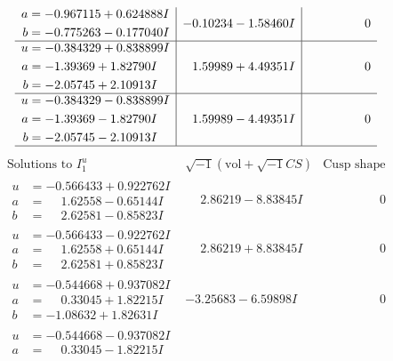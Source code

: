 \documentclass[1p]{elsarticle_modified}
\theoremstyle{definition}
\newcommand{\I}{\sqrt{-1}}
\begin{document}
$$\begin{array}{c|c|c}
\begin{aligned}
a &= -0.967115 + 0.624888 I \\
b &= -0.775263 - 0.177040 I\end{aligned}
 & -0.10234 - 1.58460 I & \phantom{-0.000000 } 0 \\ \hline\begin{aligned}
u &= -0.384329 + 0.838899 I \\
a &= -1.39369 + 1.82790 I \\
b &= -2.05745 + 2.10913 I\end{aligned}
 & \phantom{-}1.59989 + 4.49351 I & \phantom{-0.000000 } 0 \\ \hline\begin{aligned}
u &= -0.384329 - 0.838899 I \\
a &= -1.39369 - 1.82790 I \\
b &= -2.05745 - 2.10913 I\end{aligned}
 & \phantom{-}1.59989 - 4.49351 I & \phantom{-0.000000 } 0\\
 \hline 
 \end{array}$$\newpage$$\begin{array}{c|c|c}  
\text{Solutions to }I^u_{1}& \I (\text{vol} + \sqrt{-1}CS) & \text{Cusp shape}\\
 \hline 
\begin{aligned}
u &= -0.566433 + 0.922762 I \\
a &= \phantom{-}1.62558 - 0.65144 I \\
b &= \phantom{-}2.62581 - 0.85823 I\end{aligned}
 & \phantom{-}2.86219 - 8.83845 I & \phantom{-0.000000 } 0 \\ \hline\begin{aligned}
u &= -0.566433 - 0.922762 I \\
a &= \phantom{-}1.62558 + 0.65144 I \\
b &= \phantom{-}2.62581 + 0.85823 I\end{aligned}
 & \phantom{-}2.86219 + 8.83845 I & \phantom{-0.000000 } 0 \\ \hline\begin{aligned}
u &= -0.544668 + 0.937082 I \\
a &= \phantom{-}0.33045 + 1.82215 I \\
b &= -1.08632 + 1.82631 I\end{aligned}
 & -3.25683 - 6.59898 I & \phantom{-0.000000 } 0 \\ \hline\begin{aligned}
u &= -0.544668 - 0.937082 I \\
a &= \phantom{-}0.33045 - 1.82215 I \\

\end{aligned}
\end{array}$$
\end{document}
